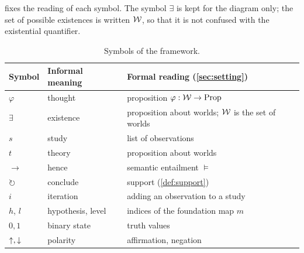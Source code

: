  fixes the reading of each symbol. The symbol $\exists$ is kept for the
diagram only; the set of possible existences is written $\mathcal W$, so that it is not confused with the
existential quantifier.

\begin{table}[ht]
\centering
\begin{tabular}{@{}lll@{}}
\toprule
Symbol & Informal meaning & Formal reading (\cref{sec:setting}) \\
\midrule
$\varphi$ & thought & proposition $\varphi:\mathcal W\to\mathrm{Prop}$ \\
$\exists$ & existence & proposition about worlds; $\mathcal W$ is the set of worlds \\
$s$ & study & list of observations \\
$t$ & theory & proposition about worlds \\
$\to$ & hence & semantic entailment $\models$ \\
$\circlearrowright$ & conclude & support (\cref{def:support}) \\
$i$ & iteration & adding an observation to a study \\
$h$, $l$ & hypothesis, level & indices of the foundation map $m$ \\
$0,1$ & binary state & truth values \\
${\uparrow},{\downarrow}$ & polarity & affirmation, negation \\
\bottomrule
\end{tabular}
\caption{Symbols of the framework.}
\label{tab:symbols}
\end{table}
